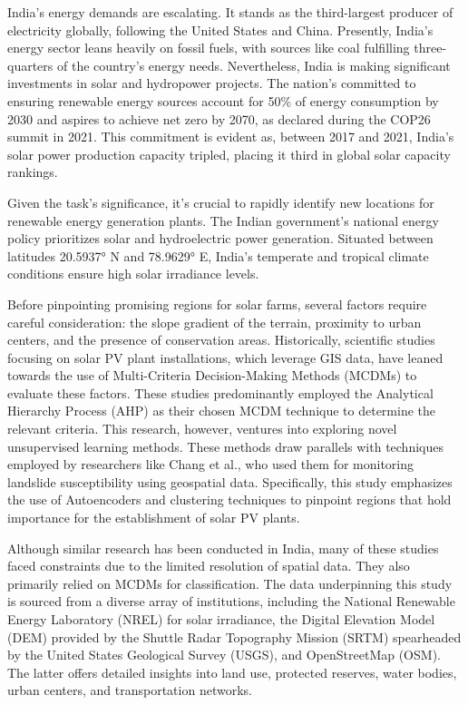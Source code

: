 \documentclass[a4paper,12pt]{Classes/RoboticsLaTeX}
\begin{document}
	India's energy demands are escalating. It stands as the third-largest producer of electricity globally, following the United States and China\cite{bp2021}. 
	Presently, India's energy sector leans heavily on fossil fuels, with sources like coal fulfilling three-quarters of the country's energy needs. Nevertheless, 
	India is making significant investments in solar and hydropower projects. The nation's committed to ensuring renewable energy sources account for 
	50\% of energy consumption by 2030 and aspires to achieve net zero by 2070, as declared during the COP26 summit in 2021\cite{bbc2023}. This commitment 
	is evident as, between 2017 and 2021, India's solar power production capacity tripled, placing it third in global solar capacity rankings\cite{reuters2022}.

	Given the task's significance, it's crucial to rapidly identify new locations for renewable energy generation plants. The Indian government's national energy policy 
	prioritizes solar and hydroelectric power generation. Situated between latitudes 20.5937° N and 78.9629° E, India's temperate and tropical climate conditions ensure 
	high solar irradiance levels.

	Before pinpointing promising regions for solar farms, several factors require careful consideration: the slope gradient of the terrain, proximity to urban centers, and the presence of conservation areas. Historically, scientific studies focusing on solar PV plant installations, which leverage GIS data, have leaned towards the use of Multi-Criteria Decision-Making Methods (MCDMs) to evaluate these factors\cite{reuters2022,colak2020,garni2017,zoghi2017,saraswat2021}. These studies predominantly employed the Analytical Hierarchy Process (AHP) as their chosen MCDM technique to determine the relevant criteria. This research, however, ventures into exploring novel unsupervised learning methods. These methods draw parallels with techniques employed by researchers like Chang et al., who used them for monitoring landslide susceptibility using geospatial data\cite{chang2020}. Specifically, this study emphasizes the use of Autoencoders and clustering techniques to pinpoint regions that hold importance for the establishment of solar PV plants.

	Although similar research has been conducted in India, many of these studies faced constraints due to the limited resolution of spatial 
	data\cite{jain2011,saraswat2021,sindhu2017}. They also primarily relied on MCDMs for classification. The data underpinning this study is sourced from a diverse array of 
	institutions, including the National Renewable Energy Laboratory (NREL) for solar irradiance, the Digital Elevation Model (DEM) provided by the Shuttle Radar Topography Mission 
	(SRTM) spearheaded by the United States Geological Survey (USGS), and OpenStreetMap (OSM). The latter offers detailed insights into land use, protected reserves, water bodies, 
	urban centers, and transportation networks.
\end{document}
